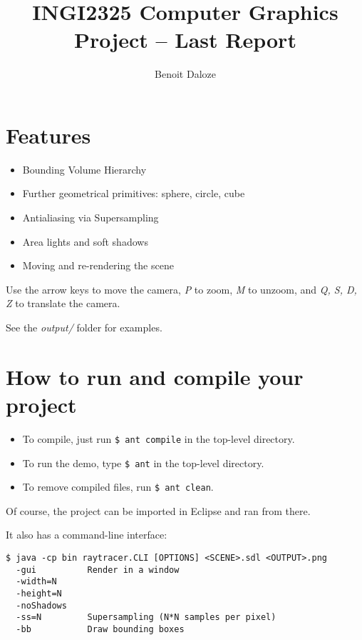\documentclass[a4paper,11pt]{article}
\title{INGI2325 Computer Graphics \\
  Project -- Last Report}
\author{Benoit Daloze}
\begin{document}
\maketitle

\section{Features}

\begin{itemize}
  \item Bounding Volume Hierarchy
  \item Further geometrical primitives: sphere, circle, cube
  \item Antialiasing via Supersampling
  \item Area lights and soft shadows
  \item Moving and re-rendering the scene
\end{itemize}

Use the arrow keys to move the camera, \emph{P} to zoom, \emph{M} to unzoom, and \emph{Q, S, D, Z} to translate the camera.

See the \emph{output/} folder for examples.

\section{How to run and compile your project}

\begin{itemize}
  \item To compile, just run \texttt{\$ ant compile} in the top-level directory.
  \item To run the demo, type \texttt{\$ ant} in the top-level directory.
  \item To remove compiled files, run \texttt{\$ ant clean}.
\end{itemize}

Of course, the project can be imported in Eclipse and ran from there.

It also has a command-line interface:
\begin{verbatim}
$ java -cp bin raytracer.CLI [OPTIONS] <SCENE>.sdl <OUTPUT>.png
  -gui          Render in a window
  -width=N
  -height=N
  -noShadows
  -ss=N         Supersampling (N*N samples per pixel)
  -bb           Draw bounding boxes
\end{verbatim}
\end{document}
